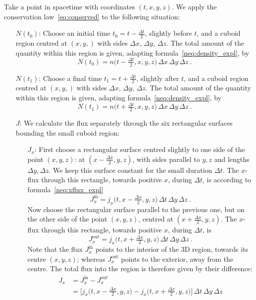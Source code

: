 \documentclass[a4paper,12pt,%
onecolumn,oneside,titlepage,%
british%
]{memoir}
\newcommand*{\incr}{\Delta}%
\renewcommand*{\|}[1][]{\nonscript\:#1\vert\nonscript\:\mathopen{}}
\newcommand*{\yN}{N}
\newcommand*{\yJ}{J}
\newcommand*{\yti}{t_{0}}
\newcommand*{\ytf}{t_{1}}
\newcommand*{\Dt}{\incr t}
\newcommand*{\Dx}{\incr x}
\newcommand*{\Dy}{\incr y}
\newcommand*{\Dz}{\incr z}
\newcommand*{\Dth}{\tfrac{\incr t}{2}}
\newcommand*{\Dxh}{\tfrac{\incr x}{2}}
\begin{document}
Take a point in spacetime with coordinates $(t,x,y,z)$. We apply the conservation law~\eqref{eq:conserved} to the following situation:
\begin{itemize}
\item[$\yN(\yti)$:] Choose an initial time $\yti=t-\Dth$, slightly before $t$, and a cuboid region centred at $(x,y,)$ with sides $\Dx$, $\Dy$, $\Dz$. The total amount of the quantity within this region is given, adapting formula~\eqref{neq:density_expl}, by
  \begin{equation}
    \label{neq:C1dens}
    \yN(\yti) = n\bigl(t-\Dth, x,y,z\bigr)\,\Dx\,\Dy\,\Dz \ .
  \end{equation}
  
\item[$\yN(\ytf)$:] Choose a final time $\ytf = t+\Dth$, slightly after $t$, and a cuboid region centred at $(x,y,)$ with sides $\Dx$, $\Dy$, $\Dz$. The total amount of the quantity within this region is given, adapting formula~\eqref{neq:density_expl}, by
  \begin{equation}
    \label{neq:C2dens}
    \yN(\ytf) = n\bigl(t+\Dth, x,y,z\bigr)\,\Dx\,\Dy\,\Dz \ .
  \end{equation}
  
\item[$\yJ$:] We calculate the flux separately through the six rectangular surfaces bounding the small cuboid region:
  \begin{itemize}
  \item[$\yJ_{x}$:] First choose a rectangular surface centred slightly to one side of the point $(x,y,z)$: at $(x-\Dxh, y, z)$, with sides parallel to $y,z$ and lengths $\Dy, \Dz$. We keep this surface constant for the small duration $\Dt$. The $x$-flux through this rectangle, towards positive $x$, during $\Dt$, is according to formula~\eqref{neq:xflux_expl}
    \begin{equation*}
      \label{neq:Fxfluxn}
     \yJ_{x}^{\text{in}} = j_{x}\bigl(t, x-\Dxh, y, z\bigr)\,\Dt\,\Dy\,\Dz \ .
    \end{equation*}
    Now choose the rectangular surface parallel to the previous one, but on the other side of the point $(x,y,z)$, centred at $(x+\Dxh, y, z)$. The $x$-flux through this rectangle, towards positive $x$, during $\Dt$, is
    \begin{equation*}
      \label{neq:Fxfluxp}
      \yJ_{x}^{\text{out}} = j_{x}\bigl(t, x+\Dxh, y, z\bigr)\,\Dt\,\Dy\,\Dz \ .
    \end{equation*}
    Note that the flux $\yJ_{x}^{\text{in}}$ points to the interior of the 3D region, towards its centre $(x,y,z)$; whereas $\yJ_{x}^{\text{out}}$ points to the exterior, away from the centre. The total flux into the region is therefore given by their difference:
    \begin{equation}
      \label{neq:Fxflux}
      \begin{split}
        \yJ_{x} &= \yJ_{x}^{\text{in}} - \yJ_{x}^{\text{out}}
        \\&= \bigl[ j_{x}\bigl(t, x-\Dxh, y, z\bigr) - j_{x}\bigl(t, x+\Dxh, y, z\bigr)\bigr]
        \,\Dt\,\Dy\,\Dz
      \end{split}
    \end{equation}
  

\end{itemize}
\end{itemize}
\end{document}
